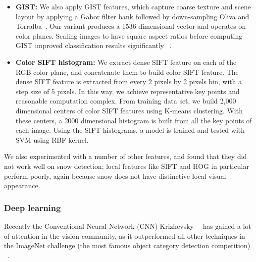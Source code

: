 \begin{itemize}
	\item \textbf{GIST:} We also apply GIST features, which capture coarse texture
	and scene layout by applying a Gabor filter bank followed by
	down-sampling Oliva and Torralba~\cite{oliva2001modeling}. Our variant produces a
	1536-dimensional  vector and operates on color planes. Scaling
	images to have square aspect ratios before computing GIST improved
	classification results significantly ~\cite{douze2009evaluation}.
	
	
	
	\item \textbf{Color SIFT histogram:}
	We extract dense SIFT feature on each of the RGB color plane, and concatenate them to build color SIFT feature. The dense SIFT feature is extracted from every 2 pixels by 2 pixels bin, with a step size of 5 pixels. In this way, we achieve representative key points and reasonable computation complex. From training data set, we build 2,000 dimensional centers of color SIFT features using K-means clustering. With these centers, a 2000 dimensional histogram is built from all the key points of each image. Using the SIFT histograms, a model is trained and tested with SVM using RBF kernel. 
	
\end{itemize}


We also experimented with a number of other features, and found that they did not work well on snow detection; local features like SIFT and HOG in particular perform poorly, again because snow does not have distinctive local visual appearance.







\subsubsection{Deep learning}
Recently the Conventional Neural Network (CNN) Krizhevsky~\etal~\cite{krizhevsky2012imagenet} has gained a lot of attention in the vision community, as it outperformed all other techniques in the ImageNet challenge (the most famous object category detection competition) ~\cite{russakovsky2014imagenet}.



